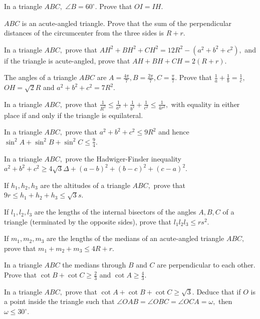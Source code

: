 \item In a triangle $ABC,$ $\angle B = 60^\circ.$ Prove that $OI = IH.$

\item $ABC$ is an acute-angled triangle. Prove that the sum of the perpendicular distances of the circumcenter from the three
   sides is $R + r.$

\item In a triangle $ABC,$ prove that $AH^2 + BH^2 + CH^2 = 12R^2 - (a^2 + b^2 + c^2),$ and if the triangle is acute-angled,
   prove that $AH + BH + CH = 2(R + r).$

\item The angles of a triangle $ABC$ are $A = \frac{4\pi}{7}, B = \frac{2\pi}{7}, C = \frac{\pi}{7}.$ Prove that
   $\frac{1}{a} + \frac{1}{b} = \frac{1}{c},$ $OH = \sqrt{2}R$ and $a^2 + b^2 + c^2 = 7R^2.$

\item In a triangle $ABC,$ prove that $\frac{1}{R^2}\leq \frac{1}{a^2} + \frac{1}{b^2} + \frac{1}{c^2}\leq \frac{1}{4r^2},$
   with equality in either place if and only if the triangle is equilateral.

\item In a triangle $ABC,$ prove that $a^2 + b^2 + c^2\leq 9R^2$ and hence $\sin^2A + \sin^2B + \sin^2C\leq \frac{9}{4}.$

\item In a triangle $ABC,$ prove the Hadwiger-Finsler inequality $a^2 + b^2 + c^2\geq 4\sqrt{3}\Delta + (a - b)^2 + (b - c)^2
   + (c - a)^2.$

\item If $h_1, h_2, h_3$ are the altitudes of a triangle $ABC,$ prove that $9r\leq h_1 + h_2 + h_3\leq \sqrt{3}s.$

\item If $l_1, l_2, l_3$ are the lengths of the internal bisectors of the angles $A, B, C$ of a triangle (terminated by the
   opposite sides), prove that $l_1l_2l_3\leq rs^2.$

\item If $m_1, m_2, m_3$ are the lengths of the medians of an acute-angled triangle $ABC,$ prove that $m_1 + m_2 + m_3\leq
   4R + r.$

\item In a triangle $ABC$ the medians through $B$ and $C$ are perpendicular to each other. Prove that $\cot B + \cot C\geq
   \frac{2}{3}$ and $\cot A\geq \frac{4}{3}.$

\item In a triangle $ABC,$ prove that $\cot A + \cot B + \cot C\geq \sqrt{3}.$ Deduce that if $O$ is a point inside the
   triangle such that $\angle OAB = \angle OBC = \angle OCA = \omega,$ then $\omega\leq 30^\circ.$

